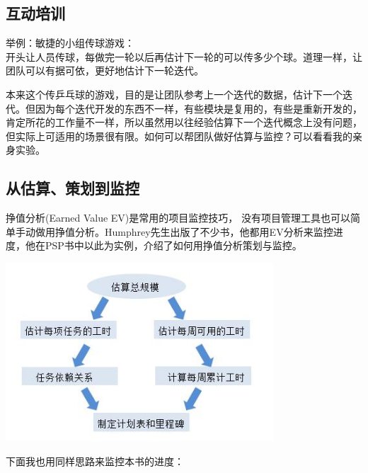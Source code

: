 \hypertarget{ux4e92ux52a8ux57f9ux8bad}{%
\subsection{互动培训}\label{ux4e92ux52a8ux57f9ux8bad}}

举例：敏捷的小组传球游戏：\\
开头让人员传球，每做完一轮以后再估计下一轮的可以传多少个球。道理一样，让团队可以有据可依，更好地估计下一轮迭代。

本来这个传乒乓球的游戏，目的是让团队参考上一个迭代的数据，估计下一个迭代。但因为每个迭代开发的东西不一样，有些模块是复用的，有些是重新开发的，肯定所花的工作量不一样，所以虽然用以往经验估算下一个迭代概念上没有问题，但实际上可适用的场景很有限。如何可以帮团队做好估算与监控？可以看看我的亲身实验。

\hypertarget{ux4eceux4f30ux7b97ux7b56ux5212ux5230ux76d1ux63a7}{%
\subsection{从估算、策划到监控}\label{ux4eceux4f30ux7b97ux7b56ux5212ux5230ux76d1ux63a7}}

挣值分析(Earned Value EV)是常用的项目监控技巧，
没有项目管理工具也可以简单手动做用挣值分析。Humphrey先生出版了不少书，他都用EV分析来监控进度，他在PSP书中以此为实例，介绍了如何用挣值分析策划与监控。


\includegraphics[width=10cm]{PSPfig72.jpg}

下面我也用同样思路来监控本书的进度：\\


